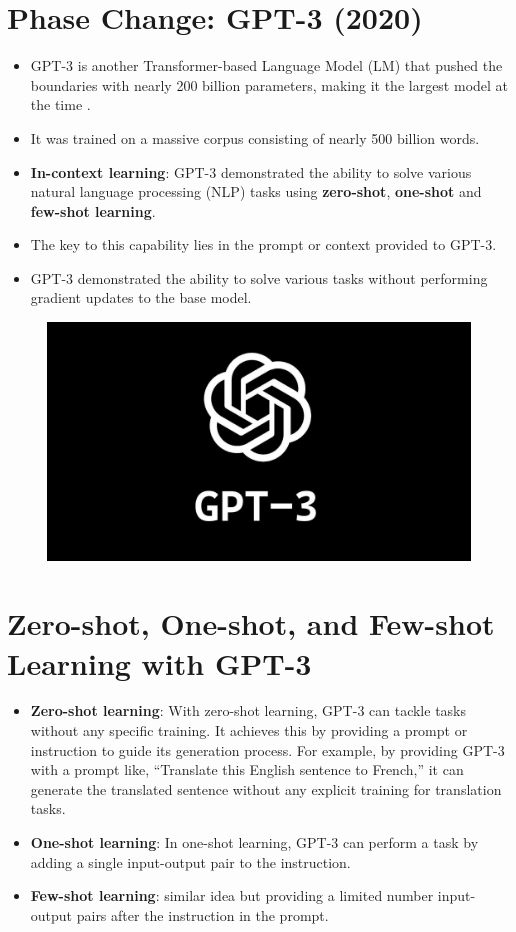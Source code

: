 \section{Phase Change: GPT-3 (2020)}
\begin{itemize}
\item GPT-3 is another Transformer-based Language Model (LM) that pushed the boundaries with nearly 200 billion parameters, making it the largest model at the time \cite{brown2020language}.
\item It was trained on a massive corpus consisting of nearly 500 billion words.
\item \textbf{In-context learning}: GPT-3 demonstrated the ability to solve various natural language processing (NLP) tasks using \textbf{zero-shot}, \textbf{one-shot} and \textbf{few-shot learning}.
\item The key to this capability lies in the prompt or context provided to GPT-3.
\item GPT-3 demonstrated the ability to solve various tasks without performing gradient updates to the base model.
\end{itemize}

 \begin{figure}[h]
        	\includegraphics[scale = 0.08]{pics/gpt3.png}
        \end{figure}  




\section{Zero-shot, One-shot, and Few-shot Learning with GPT-3}
\begin{itemize}
\item \textbf{Zero-shot learning}: With zero-shot learning, GPT-3 can tackle tasks  without any specific training. It achieves this by providing a prompt or instruction to guide its generation process. For example, by providing GPT-3 with a prompt like, ``Translate this English sentence to French,'' it can generate the translated sentence without any explicit training for translation tasks.
\item \textbf{One-shot learning}: In one-shot learning, GPT-3 can perform a task by adding a single input-output pair to the instruction.
\item \textbf{Few-shot learning}: similar idea but providing a limited number input-output pairs after the instruction in the prompt.
\end{itemize}

